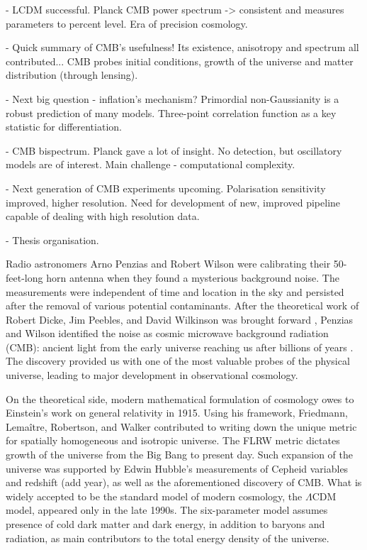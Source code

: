 - LCDM successful. Planck CMB power spectrum -> consistent and measures parameters to percent level. Era of precision cosmology.

- Quick summary of CMB's usefulness! Its existence, anisotropy and spectrum all contributed...  CMB probes initial conditions, growth of the universe and matter distribution (through lensing).

- Next big question - inflation's mechanism? Primordial non-Gaussianity is a robust prediction of many models. Three-point correlation function as a key statistic for differentiation.

- CMB bispectrum. Planck gave a lot of insight. No detection, but oscillatory models are of interest. Main challenge - computational complexity.

- Next generation of CMB experiments upcoming. Polarisation sensitivity improved, higher resolution. Need for development of new, improved pipeline capable of dealing with high resolution data.

- Thesis organisation.

Radio astronomers Arno Penzias and Robert Wilson were calibrating their 50-feet-long horn antenna when they found a mysterious background noise. The measurements were independent of time and location in the sky and persisted after the removal of various potential contaminants. After the theoretical work of Robert Dicke, Jim Peebles, and David Wilkinson was brought forward \cite{Dicke1965}, Penzias and Wilson identified the noise as cosmic microwave background radiation (CMB): ancient light from the early universe reaching us after billions of years \cite{Penzias1965}. The discovery provided us with one of the most valuable probes of the physical universe, leading to major development in observational cosmology.

On the theoretical side, modern mathematical formulation of cosmology owes to Einstein's work on general relativity in 1915. Using his framework, Friedmann, Lemaître, Robertson, and Walker contributed to writing down the unique metric for spatially homogeneous and isotropic universe. The FLRW metric dictates growth of the universe from the Big Bang to present day. Such expansion of the universe was supported by Edwin Hubble's measurements of Cepheid variables and redshift (add year), as well as the aforementioned discovery of CMB. What is widely accepted to be the standard model of modern cosmology, the $\Lambda$CDM model, appeared only in the late 1990s. The six-parameter model assumes presence of cold dark matter and dark energy, in addition to baryons and radiation, as main contributors to the total energy density of the universe.

